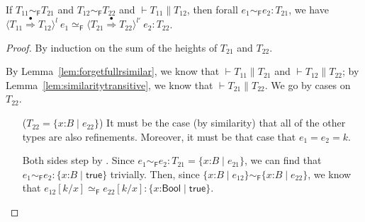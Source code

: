 \documentclass[9pt]{extarticle}
\newcommand{\ottnt}[1]{\mathit{#1}}
\newcommand{\ottsym}[1]{#1}
\begin{document}
{\begin{lemma}
  \label{lem:forgetfullrcast}
  If $ \ottnt{T_{{\mathrm{11}}}}   \sim _{  \mathsf{F}  }  \ottnt{T_{{\mathrm{21}}}} $ and $ \ottnt{T_{{\mathrm{12}}}}   \sim _{  \mathsf{F}  }  \ottnt{T_{{\mathrm{22}}}} $ and $\vdash  \ottnt{T_{{\mathrm{11}}}}  \mathrel{\parallel}  \ottnt{T_{{\mathrm{12}}}}$,
  then forall $ \ottnt{e_{{\mathrm{1}}}}   \sim _{  \mathsf{F}  }  \ottnt{e_{{\mathrm{2}}}}  :  \ottnt{T_{{\mathrm{21}}}} $, we have $  \langle  \ottnt{T_{{\mathrm{11}}}}  \mathord{ \overset{\bullet}{\Rightarrow} }  \ottnt{T_{{\mathrm{12}}}}  \rangle^{ \ottnt{l} } ~  \ottnt{e_{{\mathrm{1}}}}    \simeq _{  \mathsf{F}  }   \langle  \ottnt{T_{{\mathrm{21}}}}  \mathord{ \overset{\bullet}{\Rightarrow} }  \ottnt{T_{{\mathrm{22}}}}  \rangle^{ \ottnt{l'} } ~  \ottnt{e_{{\mathrm{2}}}}   :  \ottnt{T_{{\mathrm{22}}}} $.
\begin{proof}
    By induction on the sum of the heights of $\ottnt{T_{{\mathrm{21}}}}$ and
    $\ottnt{T_{{\mathrm{22}}}}$.
{\iffull
    By Lemma~\ref{lem:forgetfullrsimilar}, we know that
    $\vdash  \ottnt{T_{{\mathrm{11}}}}  \mathrel{\parallel}  \ottnt{T_{{\mathrm{21}}}}$ and $\vdash  \ottnt{T_{{\mathrm{12}}}}  \mathrel{\parallel}  \ottnt{T_{{\mathrm{22}}}}$; by
    Lemma~\ref{lem:similaritytransitive}, we know that $\vdash  \ottnt{T_{{\mathrm{21}}}}  \mathrel{\parallel}  \ottnt{T_{{\mathrm{22}}}}$. We go by cases on $\ottnt{T_{{\mathrm{22}}}}$.
\begin{itemize}
    \item[($\ottnt{T_{{\mathrm{22}}}}  \ottsym{=}   \{ \mathit{x} \mathord{:} \ottnt{B} \mathrel{\mid} \ottnt{e_{{\mathrm{22}}}} \} $)] It must be the case (by similarity)
      that all of the other types are also refinements. Moreover, it
      must be that case that $\ottnt{e_{{\mathrm{1}}}}  \ottsym{=}  \ottnt{e_{{\mathrm{2}}}} = \ottnt{k}$.

      Both sides step by . Since $ \ottnt{e_{{\mathrm{1}}}}   \sim _{  \mathsf{F}  }  \ottnt{e_{{\mathrm{2}}}}  :  \ottnt{T_{{\mathrm{21}}}}  =
       \{ \mathit{x} \mathord{:} \ottnt{B} \mathrel{\mid} \ottnt{e_{{\mathrm{21}}}} \} $, we can find that $ \ottnt{e_{{\mathrm{1}}}}   \sim _{  \mathsf{F}  }  \ottnt{e_{{\mathrm{2}}}}  :   \{ \mathit{x} \mathord{:} \ottnt{B} \mathrel{\mid}  \mathsf{true}  \}  $
      trivially. Then, since $  \{ \mathit{x} \mathord{:} \ottnt{B} \mathrel{\mid} \ottnt{e_{{\mathrm{12}}}} \}    \sim _{  \mathsf{F}  }   \{ \mathit{x} \mathord{:} \ottnt{B} \mathrel{\mid} \ottnt{e_{{\mathrm{22}}}} \}  $, we know
      that $  \ottnt{e_{{\mathrm{12}}}}  [  \ottnt{k} / \mathit{x}  ]    \simeq _{  \mathsf{F}  }   \ottnt{e_{{\mathrm{22}}}}  [  \ottnt{k} / \mathit{x}  ]   :   \{ \mathit{x} \mathord{:}  \mathsf{Bool}  \mathrel{\mid}  \mathsf{true}  \}  $.


\end{itemize}}
\end{proof}
\end{lemma}}
\end{document}
